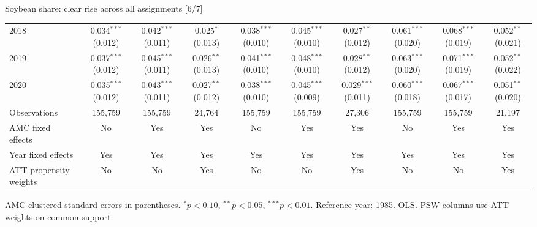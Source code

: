 \documentclass[aspectratio=169]{beamer}
\begin{document}
\begin{frame}{Soybean share: clear rise across all assignments [6/7]}
{\begin{tabular}{@{}l*{9}{c}@{}}
2018 & \shortstack{0.034$^{***}$\\(0.012)} & \shortstack{0.042$^{***}$\\(0.011)} & \shortstack{0.025$^{*}$\\(0.013)} & \shortstack{0.038$^{***}$\\(0.010)} & \shortstack{0.045$^{***}$\\(0.010)} & \shortstack{0.027$^{**}$\\(0.012)} & \shortstack{0.061$^{***}$\\(0.020)} & \shortstack{0.068$^{***}$\\(0.019)} & \shortstack{0.052$^{**}$\\(0.021)} \\
2019 & \shortstack{0.037$^{***}$\\(0.012)} & \shortstack{0.045$^{***}$\\(0.011)} & \shortstack{0.026$^{**}$\\(0.013)} & \shortstack{0.041$^{***}$\\(0.010)} & \shortstack{0.048$^{***}$\\(0.010)} & \shortstack{0.028$^{**}$\\(0.012)} & \shortstack{0.063$^{***}$\\(0.020)} & \shortstack{0.071$^{***}$\\(0.019)} & \shortstack{0.052$^{**}$\\(0.022)} \\
2020 & \shortstack{0.035$^{***}$\\(0.012)} & \shortstack{0.043$^{***}$\\(0.011)} & \shortstack{0.027$^{**}$\\(0.012)} & \shortstack{0.038$^{***}$\\(0.010)} & \shortstack{0.045$^{***}$\\(0.009)} & \shortstack{0.029$^{***}$\\(0.011)} & \shortstack{0.060$^{***}$\\(0.018)} & \shortstack{0.067$^{***}$\\(0.017)} & \shortstack{0.051$^{**}$\\(0.020)} \\
\midrule
Observations & 155,759 & 155,759 & 24,764 & 155,759 & 155,759 & 27,306 & 155,759 & 155,759 & 21,197 \\
AMC fixed effects & No & Yes & Yes & No & Yes & Yes & No & Yes & Yes \\
Year fixed effects & Yes & Yes & Yes & Yes & Yes & Yes & Yes & Yes & Yes \\
ATT propensity weights & No & No & Yes & No & No & Yes & No & No & Yes \\
\bottomrule
\end{tabular}%
}
\vspace{0.1em}
{\tiny\color{ZMidGray} AMC-clustered standard errors in parentheses. $^{*}p<0.10$, $^{**}p<0.05$, $^{***}p<0.01$. Reference year: 1985. OLS. PSW columns use ATT weights on common support.}
\end{frame}
\end{document}
